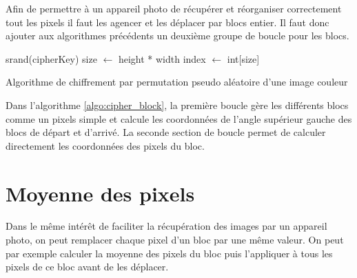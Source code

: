 \documentclass[a4paper]{article}
\begin{document}
        Afin de permettre à un appareil photo de récupérer et réorganiser correctement tout les pixels il faut les agencer et les déplacer par blocs entier. Il faut donc ajouter aux algorithmes précédents un deuxième groupe de boucle pour les blocs.

        \begin{algorithm}[htbp]
            \SetAlgoLined
            srand(cipherKey)\;
            size $\leftarrow$ height * width\;
            index $\leftarrow$ int[size]\;
            \caption{Algorithme de chiffrement par permutation pseudo aléatoire d'une image couleur}
            \label{algo:cipher_block}
        \end{algorithm}

        Dans l'algorithme \ref{algo:cipher_block}, la première boucle gère les différents blocs comme un pixels simple et calcule les coordonnées de l'angle supérieur gauche des blocs de départ et d'arrivé. La seconde section de boucle permet de calculer directement les coordonnées des pixels du bloc.

    \section{Moyenne des pixels}

        Dans le même intérêt de faciliter la récupération des images par un appareil photo, on peut remplacer chaque pixel d'un bloc par une même valeur. On peut par exemple calculer la moyenne des pixels du bloc puis l'appliquer à tous les pixels de ce bloc avant de les déplacer.
\end{document}
